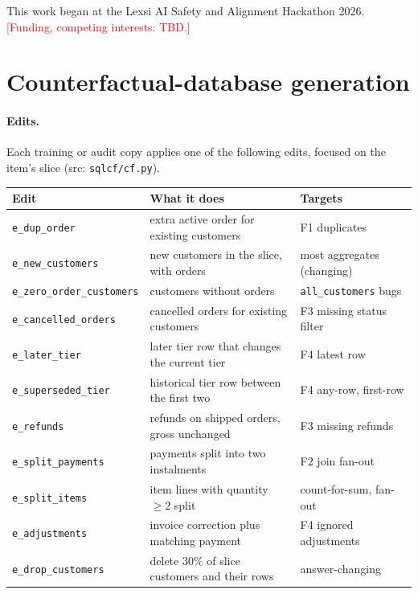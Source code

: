 \documentclass{article}
\newcommand{\placeholder}[1]{\textcolor{red}{[#1]}}
\begin{document}
\begin{ack}
This work began at the Lexsi AI Safety and Alignment Hackathon 2026. \placeholder{Funding, competing interests: TBD.}
\end{ack}


{\small
}

\clearpage
\appendix

\section{Counterfactual-database generation}
\label{app:cf}

\paragraph{Edits.}
Each training or audit copy applies one of the following edits, focused on the item's slice (src: \texttt{sqlcf/cf.py}).
\begin{center}\footnotesize
\begin{tabular}{lll}
\toprule
Edit & What it does & Targets \\
\midrule
\texttt{e\_dup\_order} & extra active order for existing customers & F1 duplicates \\
\texttt{e\_new\_customers} & new customers in the slice, with orders & most aggregates (changing) \\
\texttt{e\_zero\_order\_customers} & customers without orders & \texttt{all\_customers} bugs \\
\texttt{e\_cancelled\_orders} & cancelled orders for existing customers & F3 missing status filter \\
\texttt{e\_later\_tier} & later tier row that changes the current tier & F4 latest row \\
\texttt{e\_superseded\_tier} & historical tier row between the first two & F4 any-row, first-row \\
\texttt{e\_refunds} & refunds on shipped orders, gross unchanged & F3 missing refunds \\
\texttt{e\_split\_payments} & payments split into two instalments & F2 join fan-out \\
\texttt{e\_split\_items} & item lines with quantity $\geq 2$ split & count-for-sum, fan-out \\
\texttt{e\_adjustments} & invoice correction plus matching payment & F4 ignored adjustments \\
\texttt{e\_drop\_customers} & delete 30\% of slice customers and their rows & answer-changing \\
\bottomrule
\end{tabular}
\end{center}
\end{document}
